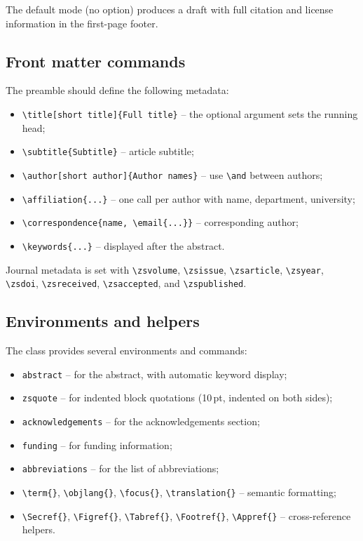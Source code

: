\documentclass{zsarticle}
\begin{document}
The default mode (no option) produces a draft with full citation and license information in the first-page footer.

\subsection{Front matter commands}\label{sec:frontmatter}

The preamble should define the following metadata:
\begin{itemize}
\item \verb|\title[short title]{Full title}| -- the optional argument sets the running head;
\item \verb|\subtitle{Subtitle}| -- article subtitle;
\item \verb|\author[short author]{Author names}| -- use \verb|\and| between authors;
\item \verb|\affiliation{...}| -- one call per author with name, department, university;
\item \verb|\correspondence{name, \email{...}}| -- corresponding author;
\item \verb|\keywords{...}| -- displayed after the abstract.
\end{itemize}

Journal metadata is set with \verb|\zsvolume|, \verb|\zsissue|, \verb|\zsarticle|, \verb|\zsyear|, \verb|\zsdoi|, \verb|\zsreceived|, \verb|\zsaccepted|, and \verb|\zspublished|.

\subsection{Environments and helpers}\label{sec:environments}

The class provides several environments and commands:
\begin{itemize}
\item \texttt{abstract} -- for the abstract, with automatic keyword display;
\item \texttt{zsquote} -- for indented block quotations (10\,pt, indented on both sides);
\item \texttt{acknowledgements} -- for the acknowledgements section;
\item \texttt{funding} -- for funding information;
\item \texttt{abbreviations} -- for the list of abbreviations;
\item \verb|\term{}|, \verb|\objlang{}|, \verb|\focus{}|, \verb|\translation{}| -- semantic formatting;
\item \verb|\Secref{}|, \verb|\Figref{}|, \verb|\Tabref{}|, \verb|\Footref{}|, \verb|\Appref{}| -- cross-reference helpers.
\end{itemize}
\end{document}
